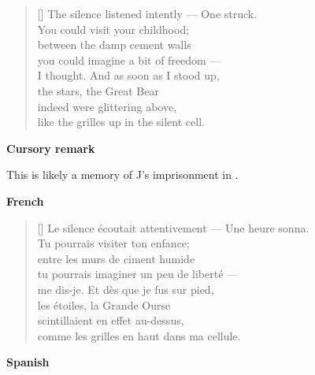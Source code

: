 \documentclass[a4paper,12pt,twoside,final]{book}
\begin{document}
\newpage



\settowidth{\versewidth}{The silence listened intently --- One struck.}

\begin{verse}[\versewidth]
  The silence listened intently --- One struck. \\
  You could visit your childhood; \\
  between the damp cement walls \\
  you could imagine a bit of freedom --- \\
  I thought. And as soon as I stood up, \\
  the stars, the Great Bear \\
  indeed were glittering above, \\
  like the grilles up in the silent cell. \\
\end{verse}

\bigskip

\noindent \textbf{Cursory remark}

\medskip

This is likely a memory of J's imprisonment in .

\bigskip

\noindent \textbf{French}


\settowidth{\versewidth}{Le silence écoutait attentivement --- Une heure sonna.}

\begin{verse}[\versewidth]
  Le silence écoutait attentivement --- Une heure sonna. \\
  Tu pourrais visiter ton enfance; \\
  entre les murs de ciment humide \\
  tu pourrais imaginer un peu de liberté --- \\
  me dis-je. Et dès que je fus sur pied, \\
  les étoiles, la Grande Ourse \\
  scintillaient en effet au-dessus, \\
  comme les grilles en haut dans ma cellule. \\
\end{verse}

\bigskip

\noindent \textbf{Spanish}
\end{document}

